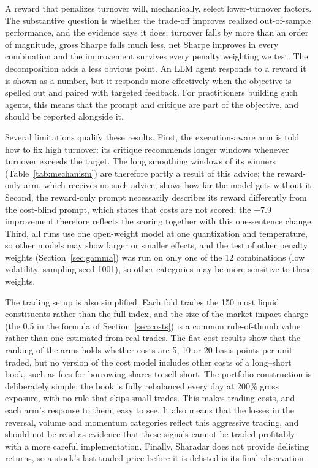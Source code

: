 \documentclass[preprint,12pt,authoryear]{elsarticle}
\begin{document}
A reward that penalizes turnover will, mechanically, select lower-turnover factors. The substantive question is whether the trade-off improves realized out-of-sample performance, and the evidence says it does: turnover falls by more than an order of magnitude, gross Sharpe falls much less, net Sharpe improves in every combination and the improvement survives every penalty weighting we test. The decomposition adds a less obvious point. An LLM agent responds to a reward it is shown as a number, but it responds more effectively when the objective is spelled out and paired with targeted feedback. For practitioners building such agents, this means that the prompt and critique are part of the objective, and should be reported alongside it.

Several limitations qualify these results. First, the execution-aware arm is told how to fix high turnover: its critique recommends longer windows whenever turnover exceeds the target. The long smoothing windows of its winners (Table~\ref{tab:mechanism}) are therefore partly a result of this advice; the reward-only arm, which receives no such advice, shows how far the model gets without it. Second, the reward-only prompt necessarily describes its reward differently from the cost-blind prompt, which states that costs are not scored; the +7.9 improvement therefore reflects the scoring together with this one-sentence change. Third, all runs use one open-weight model at one quantization and temperature, so other models may show larger or smaller effects, and the test of other penalty weights (Section~\ref{sec:gamma}) was run on only one of the 12 combinations (low volatility, sampling seed 1001), so other categories may be more sensitive to these weights.

The trading setup is also simplified. Each fold trades the 150 most liquid constituents rather than the full index, and the size of the market-impact charge (the 0.5 in the formula of Section~\ref{sec:costs}) is a common rule-of-thumb value rather than one estimated from real trades. The flat-cost results show that the ranking of the arms holds whether costs are 5, 10 or 20 basis points per unit traded, but no version of the cost model includes other costs of a long--short book, such as fees for borrowing shares to sell short. The portfolio construction is deliberately simple: the book is fully rebalanced every day at 200\% gross exposure, with no rule that skips small trades. This makes trading costs, and each arm's response to them, easy to see. It also means that the losses in the reversal, volume and momentum categories reflect this aggressive trading, and should not be read as evidence that these signals cannot be traded profitably with a more careful implementation. Finally, Sharadar does not provide delisting returns, so a stock's last traded price before it is delisted is its final observation.
\end{document}
